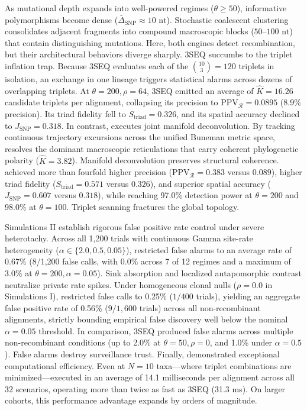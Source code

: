 As mutational depth expands into well-powered regimes ($\theta \ge 50$), informative polymorphisms become dense ($\bar{\Delta}_{\text{SNP}} \approx 10\text{ nt}$).
Stochastic coalescent clustering consolidates adjacent fragments into compound macroscopic blocks ($50$--$100\text{ nt}$) that contain distinguishing mutations.
Here, both engines detect recombination, but their architectural behaviors diverge sharply.
3SEQ succumbs to the triplet inflation trap.
Because 3SEQ evaluates each of the $\binom{10}{3} = 120$ triplets in isolation, an exchange in one lineage triggers statistical alarms across dozens of overlapping triplets.
At $\theta = 200, \rho = 64$, 3SEQ emitted an average of $\hat{K} = 16.26$ candidate triplets per alignment, collapsing its precision to $\text{PPV}_{\mathcal{R}} = 0.0895$ (8.9\% precision).
Its triad fidelity fell to $S_{\text{triad}} = 0.326$, and its spatial accuracy declined to $J_{\text{SNP}} = 0.318$.
In contrast, \RhizAeon executes joint manifold deconvolution.
By tracking continuous trajectory excursions across the unified Buneman metric space, \RhizAeon resolves the dominant macroscopic reticulations that carry coherent phylogenetic polarity ($\hat{K} = 3.82$).
Manifold deconvolution preserves structural coherence.
\RhizAeon achieved more than fourfold higher precision ($\text{PPV}_{\mathcal{R}} = 0.383$ versus $0.089$), higher triad fidelity ($S_{\text{triad}} = 0.571$ versus $0.326$), and superior spatial accuracy ($J_{\text{SNP}} = 0.607$ versus $0.318$), while reaching 97.0\% detection power at $\theta = 200$ and 98.0\% at $\theta = 100$.
Triplet scanning fractures the global topology.

Simulations II establish rigorous false positive rate control under severe heterotachy.
Across all 1,200 trials with continuous Gamma site-rate heterogeneity ($\alpha \in \{2.0, 0.5, 0.05\}$), \RhizAeon restricted false alarms to an average rate of 0.67\% (8/1,200 false calls, with 0.0\% across 7 of 12 regimes and a maximum of 3.0\% at $\theta = 200, \alpha = 0.05$).
Sink absorption and localized autapomorphic contrast neutralize private rate spikes.
Under homogeneous clonal nulls ($\rho = 0.0$ in Simulations I), \RhizAeon restricted false calls to 0.25\% ($1/400$ trials), yielding an aggregate false positive rate of 0.56\% ($9/1,600$ trials) across all non-recombinant alignments, strictly bounding empirical false discovery well below the nominal $\alpha = 0.05$ threshold.
In comparison, 3SEQ produced false alarms across multiple non-recombinant conditions (up to 2.0\% at $\theta = 50, \rho = 0$, and 1.0\% under $\alpha = 0.5$).
False alarms destroy surveillance trust.
Finally, \RhizAeon demonstrated exceptional computational efficiency.
Even at $N=10$ taxa---where triplet combinations are minimized---\RhizAeon executed in an average of 14.1 milliseconds per alignment across all 32 scenarios, operating more than twice as fast as 3SEQ (31.3 ms).
On larger cohorts, this performance advantage expands by orders of magnitude.

